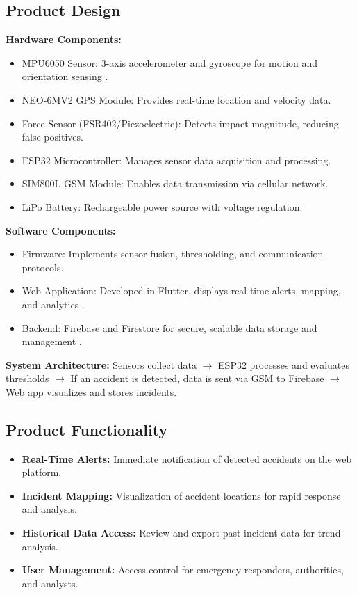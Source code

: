 \documentclass[12pt]{article}
\begin{document}
\subsection{Product Design}
\textbf{Hardware Components:}
\begin{itemize}
  \item MPU6050 Sensor: 3-axis accelerometer and gyroscope for motion and orientation sensing \cite{mpu6050}.
  \item NEO-6MV2 GPS Module: Provides real-time location and velocity data.
  \item Force Sensor (FSR402/Piezoelectric): Detects impact magnitude, reducing false positives.
  \item ESP32 Microcontroller: Manages sensor data acquisition and processing.
  \item SIM800L GSM Module: Enables data transmission via cellular network.
  \item LiPo Battery: Rechargeable power source with voltage regulation.
\end{itemize}

\textbf{Software Components:}
\begin{itemize}
  \item Firmware: Implements sensor fusion, thresholding, and communication protocols.
  \item Web Application: Developed in Flutter, displays real-time alerts, mapping, and analytics \cite{flutter}.
  \item Backend: Firebase and Firestore for secure, scalable data storage and management \cite{firebase}.
\end{itemize}

\textbf{System Architecture:} 
Sensors collect data $\rightarrow$ ESP32 processes and evaluates thresholds $\rightarrow$ If an accident is detected, data is sent via GSM to Firebase $\rightarrow$ Web app visualizes and stores incidents.

\subsection{Product Functionality}
\begin{itemize}
  \item \textbf{Real-Time Alerts:} Immediate notification of detected accidents on the web platform.
  \item \textbf{Incident Mapping:} Visualization of accident locations for rapid response and analysis.
  \item \textbf{Historical Data Access:} Review and export past incident data for trend analysis.
  \item \textbf{User Management:} Access control for emergency responders, authorities, and analysts.
\end{itemize}
\end{document}
